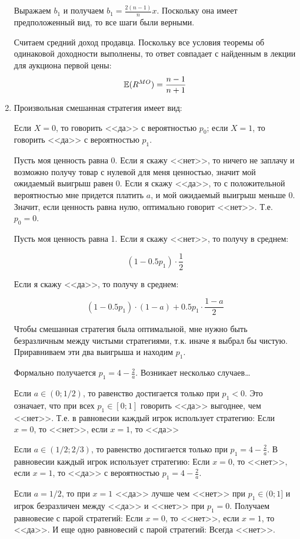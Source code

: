 \begin{enumerate}
Выражаем $ b_{1} $ и получаем $ b_{1}=\frac{2(n-1)}{n}x $. Поскольку она имеет предположенный вид, то все шаги были верными.


Считаем средний доход продавца. Поскольку все условия теоремы об одинаковой доходности выполнены, то ответ совпадает с найденным в лекции для аукциона первой цены: 
\begin{equation}
 \mathbb{E}(R^{MO})=\frac{n-1}{n+1}
\end{equation} 


\item 
Произвольная смешанная стратегия имеет вид:

Если $ X=0 $, то говорить <<да>> с вероятностью $ p_{0} $; если $ X=1 $, то говорить <<да>> с вероятностью $ p_{1} $. 

Пусть моя ценность равна 0. Если я скажу <<нет>>, то ничего не заплачу и возможно получу товар с нулевой для меня ценностью, значит мой ожидаемый выигрыш равен 0. Если я скажу <<да>>, то с положительной вероятностью мне придется платить $ a $, и мой ожидаемый выигрыш меньше 0. Значит, если ценность равна нулю, оптимально говорит  <<нет>>. Т.е. $ p_{0}=0 $.

Пусть моя ценность равна 1. Если я скажу <<нет>>, то получу в среднем:

\begin{equation}
(1-0.5p_{1})\cdot \frac{1}{2}
\end{equation}


Если я скажу <<да>>, то получу в среднем:

\begin{equation}
(1-0.5p_{1})\cdot (1-a)+0.5p_{1}\cdot \frac{1-a}{2}
\end{equation}

Чтобы смешанная стратегия была оптимальной, мне нужно быть безразличным между чистыми стратегиями, т.к. иначе я выбрал бы чистую. Приравниваем эти два выигрыша и находим $ p_{1} $.

Формально получается $ p_{1}=4-\frac{2}{a}$. Возникает несколько случаев\ldots

Если $ a\in (0;1/2) $, то равенство достигается только при $ p_{1}<0 $. Это означает, что при всех $ p_{1}\in [0;1] $ говорить <<да>> выгоднее, чем <<нет>>. Т.е. в равновесии каждый игрок использует стратегию: Если $ x=0 $, то <<нет>>, если $ x=1 $, то <<да>>

Если $ a\in (1/2;2/3) $, то равенство достигается только при $ p_{1}=4-\frac{2}{a} $. В равновесии каждый игрок использует стратегию: Если $ x=0 $, то <<нет>>, если $ x=1 $, то <<да>> с вероятностью $ p_{1}=4-\frac{2}{a}  $.

Если $ a=1/2 $, то при $ x=1 $ <<да>> лучше чем <<нет>> при $ p_{1}\in (0;1] $ и игрок безразличен между <<да>> и <<нет>> при $ p_{1}=0 $. Получаем равновесие с парой стратегий: Если $ x=0 $, то <<нет>>, если $ x=1 $, то <<да>>. И еще одно равновесий с парой стратегий: Всегда <<нет>>.

\end{enumerate}

